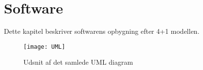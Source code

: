 \documentclass[Main]{subfiles}
\begin{document}
\chapter{Software}
Dette kapitel beskriver softwarens opbygning efter 4+1 modellen. 


\begin{figure}[H]
\centering
\texttt{[image: UML]}
\caption{Udsnit af det samlede UML diagram}
\end{figure}






\end{document}
